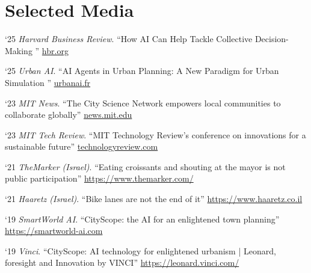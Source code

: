\section*{Selected Media}
\begin{tablist}

    \item[`25] \tab \textit{Harvard Business Review}. \enquote{How AI Can Help Tackle Collective Decision-Making
    }
    \href{https://hbr.org/2025/08/how-ai-can-help-tackle-collective-decision-making}{hbr.org}

    \item[`25] \tab \textit{Urban AI}. \enquote{AI Agents in Urban Planning: A New Paradigm for Urban Simulation
    }
    \href{https://medium.com/urban-ai/ai-agents-in-urban-planning-a-new-paradigm-for-urban-simulation-41c4c210e4a8}{urbanai.fr}

    \item[`23] \tab \textit{MIT News}. \enquote{The City Science Network empowers local communities to collaborate globally}
    \href{https://news.mit.edu/2023/city-science-network-empowers-local-communities-collaborate-globally-1103}{news.mit.edu}

    \item[`23] \tab \textit{MIT Tech Review}. \enquote{MIT Technology Review’s conference
        on innovations for a sustainable future}
    \href{https://event.technologyreview.com/climatetech-2023}{technologyreview.com}

    \item[`21] \tab \textit{TheMarker (Israel)}. \enquote{Eating croissants and shouting at the mayor is not public participation}
    \href{https://www.themarker.com/realestate/.premium-1.9490242}{https://www.themarker.com/}

    \item[`21] \tab \textit{Haaretz (Israel)}. \enquote{Bike lanes are not the end of it}
    \href{https://www.haaretz.co.il/magazine/.premium.HIGHLIGHT-MAGAZINE-1.10002361}{https://www.haaretz.co.il}

    \item[`19] \tab \textit{SmartWorld AI}. \enquote{CityScope: the AI for an enlightened town planning}
    \href{https://smartworld-ai.com/cityscope-the-ai-for-an-enlightened-town-planning/}{https://smartworld-ai.com}

    \item[`19] \tab \textit{Vinci}. \enquote{CityScope: AI technology for enlightened urbanism | Leonard, foresight and Innovation by VINCI}
    \href{https://leonard.vinci.com/en/cityscope-ai-technology-for-enlightened-urbanism/}{https://leonard.vinci.com/}


\end{tablist}
